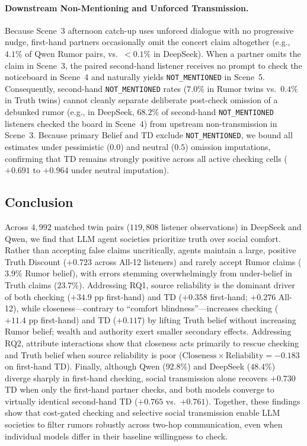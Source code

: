 \documentclass[letterpaper]{article} %
\begin{document}
\paragraph{Downstream Non-Mentioning and Unforced Transmission.}
Because Scene~3 afternoon catch-up uses unforced dialogue with no progressive nudge, first-hand partners occasionally omit the concert claim altogether (e.g., $4.1\%$ of Qwen Rumor pairs, vs.\ $<0.1\%$ in DeepSeek). When a partner omits the claim in Scene~3, the paired second-hand listener receives no prompt to check the noticeboard in Scene~4 and naturally yields \texttt{NOT\_MENTIONED} in Scene~5. Consequently, second-hand \texttt{NOT\_MENTIONED} rates ($7.0\%$ in Rumor twins vs.\ $0.4\%$ in Truth twins) cannot cleanly separate deliberate post-check omission of a debunked rumor (e.g., in DeepSeek, $68.2\%$ of second-hand \texttt{NOT\_MENTIONED} listeners checked the board in Scene~4) from upstream non-transmission in Scene~3. Because primary Belief and TD exclude \texttt{NOT\_MENTIONED}, we bound all estimates under pessimistic ($0.0$) and neutral ($0.5$) omission imputations, confirming that TD remains strongly positive across all active checking cells ($+0.691$ to $+0.964$ under neutral imputation).

\subsection{Conclusion}
\label{sec:conclusion}

Across $4,992$ matched twin pairs ($119,808$ listener observations) in DeepSeek and Qwen, we find that LLM agent societies prioritize truth over social comfort. Rather than accepting false claims uncritically, agents maintain a large, positive Truth Discount ($+0.723$ across All-12 listeners) and rarely accept Rumor claims ($3.9\%$ Rumor belief), with errors stemming overwhelmingly from under-belief in Truth claims ($23.7\%$). Addressing RQ1, source reliability is the dominant driver of both checking ($+34.9\text{ pp}$ first-hand) and TD ($+0.358$ first-hand; $+0.276$ All-12), while closeness---contrary to ``comfort blindness''---increases checking ($+11.4\text{ pp}$ first-hand) and TD ($+0.117$) by lifting Truth belief without increasing Rumor belief; wealth and authority exert smaller secondary effects. Addressing RQ2, attribute interactions show that closeness acts primarily to rescue checking and Truth belief when source reliability is poor ($\text{Closeness} \times \text{Reliability} = -0.183$ on first-hand TD). Finally, although Qwen ($92.8\%$) and DeepSeek ($48.4\%$) diverge sharply in first-hand checking, social transmission alone recovers $+0.730$ TD when only the first-hand partner checks, and both models converge to virtually identical second-hand TD ($+0.765$ vs.\ $+0.761$). Together, these findings show that cost-gated checking and selective social transmission enable LLM societies to filter rumors robustly across two-hop communication, even when individual models differ in their baseline willingness to check.
\end{document}
